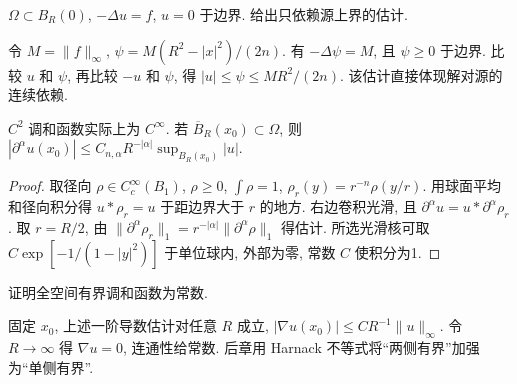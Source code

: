 \begin{example}
$\Omega\subset B_R(0)$, $-\Delta u=f$, $u=0$ 于边界. 给出只依赖源上界的估计.
\end{example}
\begin{solution}
令 $M=\|f\|_\infty$, $\psi=M(R^2-|x|^2)/(2n)$. 有 $-\Delta\psi=M$, 且 $\psi\ge0$ 于边界. 比较 $u$ 和 $\psi$, 再比较 $-u$ 和 $\psi$, 得 $|u|\le\psi\le MR^2/(2n)$. 该估计直接体现解对源的连续依赖.
\end{solution}
\begin{proposition}\label{prop:harmonicsmooth}
$C^2$ 调和函数实际上为 $C^\infty$. 若 $\overline B_R(x_0)\subset\Omega$, 则
$|\partial^\alpha u(x_0)|\le C_{n,\alpha}R^{-|\alpha|}\sup_{B_R(x_0)}|u|$.
\end{proposition}
\begin{proof}
取径向 $\rho\in C_c^\infty(B_1)$, $\rho\ge0$, $\int\rho=1$, $\rho_r(y)=r^{-n}\rho(y/r)$. 用球面平均和径向积分得 $u*\rho_r=u$ 于距边界大于 $r$ 的地方. 右边卷积光滑, 且 $\partial^\alpha u=u*\partial^\alpha\rho_r$. 取 $r=R/2$, 由 $\|\partial^\alpha\rho_r\|_1=r^{-|\alpha|}\|\partial^\alpha\rho\|_1$ 得估计. 所选光滑核可取 $C\exp[-1/(1-|y|^2)]$ 于单位球内, 外部为零, 常数 $C$ 使积分为1.
\end{proof}
\begin{exercise}
证明全空间有界调和函数为常数.
\end{exercise}
\begin{solution}
固定 $x_0$, 上述一阶导数估计对任意 $R$ 成立, $|\nabla u(x_0)|\le C R^{-1}\|u\|_\infty$. 令 $R\to\infty$ 得 $\nabla u=0$, 连通性给常数. 后章用 Harnack 不等式将“两侧有界”加强为“单侧有界”.
\end{solution}
